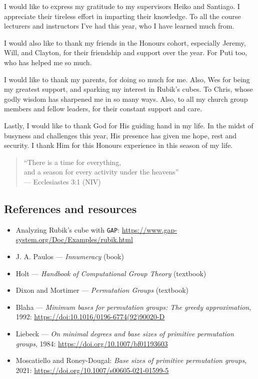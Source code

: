 \documentclass{beamer}
\begin{document}
\begin{slide}
    \scriptsize

    I would like to express my gratitude to my supervisors Heiko and Santiago. I appreciate their tireless effort in imparting their knowledge. To all the course lecturers and instructors I've had this year, who I have learned much from.

    I would also like to thank my friends in the Honours cohort, especially Jeremy, Will, and Clayton, for their friendship and support over the year. For Puti too, who has helped me so much.

    I would like to thank my parents, for doing so much for me. Also, Wes for being my greatest support, and sparking my interest in Rubik's cubes. To Chris, whose godly wisdom has sharpened me in so many ways. Also, to all my church group members and fellow leaders, for their constant support and care.

    Lastly, I would like to thank God for His guiding hand in my life. In the midst of busyness and challenges this year, His presence has given me hope, rest and security. I thank Him for this Honours experience in this season of my life.

    \vspace{0.25cm}
    \begin{quote}
        ``There is a time for everything, \\
        \hspace*{15pt} and a season for every activity under the heavens'' \\
        \null\hfill --- Ecclesiastes 3:1 (NIV)
    \end{quote}
\end{slide}


\subsection{References and resources}

\begin{slide}
    \small
    \begin{itemize}
        \item Analyzing Rubik's cube with \texttt{GAP}: \url{https://www.gap-system.org/Doc/Examples/rubik.html}
        \item J. A. Paulos --- \textit{Innumeracy} (book)
        \item Holt --- \textit{Handbook of Computational Group Theory} (textbook)
        \item Dixon and Mortimer --- \textit{Permutation Groups} (textbook)
        \item Blaha --- \textit{Minimum bases for permutation groups: The greedy approximation}, 1992: \url{https://doi:10.1016/0196-6774(92)90020-D}
        \item Liebeck --- \textit{On minimal degrees and base sizes of primitive permutation groups}, 1984: \url{https://doi.org/10.1007/bf01193603}
        \item Moscatiello and Roney-Dougal: \textit{Base sizes of primitive permutation groups}, 2021: \url{https://doi.org/10.1007/s00605-021-01599-5}
    \end{itemize}
\end{slide}
\end{document}
